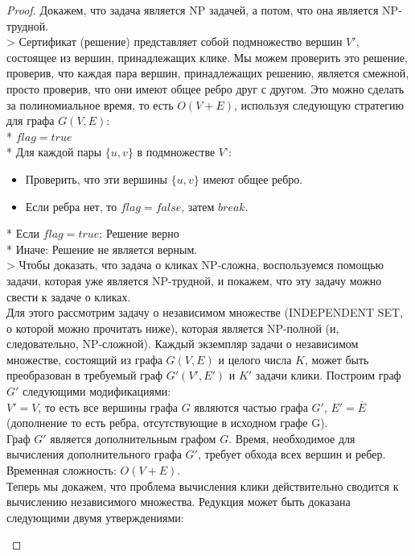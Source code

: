     \begin{proof}
        Докажем, что задача является NP задачей, а потом, что она является NP-трудной.\\
        > Сертификат (решение) представляет собой подмножество вершин $V'$, состоящее из вершин, принадлежащих клике. Мы можем проверить это решение, проверив, что каждая пара вершин, принадлежащих решению, является смежной, просто проверив, что они имеют общее ребро друг с другом. Это можно сделать за полиномиальное время, то есть $O(V + E)$, используя следующую стратегию для графа $G(V, E)$:\\
        * $flag = true$\\
        * Для каждой пары $\{u, v\}$ в подмножестве $V’$:
        \begin{itemize}
        \item Проверить, что эти вершины $\{u, v\}$ имеют общее ребро.
        \item Если ребра нет, то $flag = false$, затем $break$.
        \end{itemize}
        * Если $flag = true$: Решение верно\\
        * Иначе: Решение не является верным.\\
        > Чтобы доказать, что задача о кликах NP-сложна, воспользуемся помощью задачи, которая уже является NP-трудной, и покажем, что эту задачу можно свести к задаче о кликах.\\
        Для этого рассмотрим задачу о независимом множестве (INDEPENDENT SET, о которой можно прочитать ниже), которая является NP-полной (и, следовательно, NP-сложной). Каждый экземпляр задачи о независимом множестве, состоящий из графа $G(V, E)$ и целого числа $K$, может быть преобразован в требуемый граф $G'(V', E')$ и $K'$ задачи клики. Построим граф $G'$ следующими модификациями:\\
        $V' = V$, то есть все вершины графа $G$ являются частью графа $G'$, $E'= \overline{E}$ (дополнение то есть ребра, отсутствующие в исходном графе G).\\
        Граф $G'$ является дополнительным графом $G$. Время, необходимое для вычисления дополнительного графа $G'$, требует обхода всех вершин и ребер.
        Временная сложность: $O(V+E)$.\\
        Теперь мы докажем, что проблема вычисления клики действительно сводится к вычислению независимого множества. Редукция может быть доказана следующими двумя утверждениями:\\
        \begin{itemize}

\end{itemize}
\end{proof}
